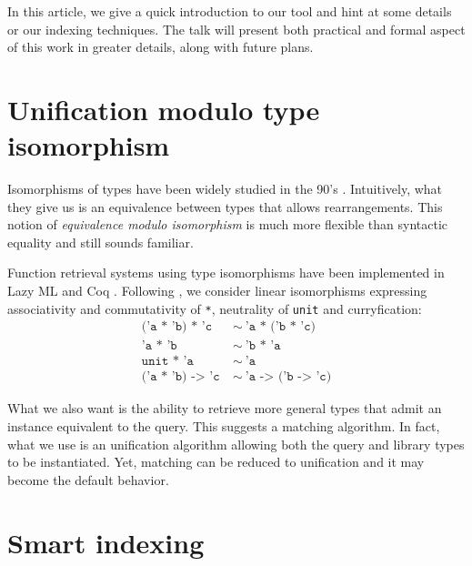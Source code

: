 \documentclass [a4paper,11pt] {scrartcl}
\begin{document}
In this article, we give a quick introduction to our tool and hint at some
details or our indexing techniques. The talk will present both practical
and formal aspect of this work in greater details, along with
future plans.





\section {Unification modulo type isomorphism}

Isomorphisms of types have been widely studied in the 90's \cite {dicosmo}. Intuitively, what they give us is an equivalence between types that allows rearrangements. This notion of \textit {equivalence modulo isomorphism} is much more flexible than syntactic equality and still sounds familiar.

Function retrieval systems using type isomorphisms have been implemented in Lazy ML \cite {rittri} and Coq \cite {delahaye}. Following \cite {rittri}, we consider linear isomorphisms expressing associativity and commutativity of \texttt {*}, neutrality of \texttt {unit} and curryfication:
\begin {align*}
  \texttt {('a * 'b) * 'c} &\ \sim\ \texttt {'a * ('b * 'c)} \\
  \texttt {'a * 'b} &\ \sim\ \texttt {'b * 'a} \\
  \texttt {unit * 'a} &\ \sim\ \texttt {'a} \\
  \texttt {('a * 'b) -> 'c} &\ \sim\ \texttt {'a -> ('b -> 'c)}
\end {align*}

What we also want is the ability to retrieve more general types that admit an instance equivalent to the query. This suggests a matching algorithm. In fact, what we use is an unification algorithm \cite {boudet} allowing both the query and library types to be instantiated. Yet, matching can be reduced to unification and it may become the default behavior.


\section {Smart indexing}
\end{document}
